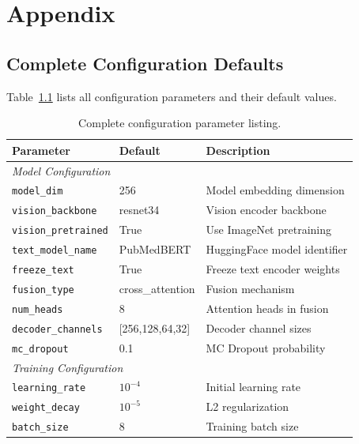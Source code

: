 
\appendix

\chapter{Appendix}
\label{ch:Appendix}

\section{Complete Configuration Defaults}
\label{sec:app:config}

Table~\ref{tab:full_config} lists all configuration parameters and their default values.

\begin{table}[htbp]
	\caption{Complete configuration parameter listing.}
	\label{tab:full_config}
	\centering
	\small
	\begin{tabular}{llp{6cm}}
		\toprule
		\textbf{Parameter} & \textbf{Default} & \textbf{Description} \\
		\midrule
		\multicolumn{3}{l}{\textit{Model Configuration}} \\
		\texttt{model\_dim}         & 256    & Model embedding dimension \\
		\texttt{vision\_backbone}   & resnet34 & Vision encoder backbone \\
		\texttt{vision\_pretrained} & True   & Use ImageNet pretraining \\
		\texttt{text\_model\_name}  & PubMedBERT & HuggingFace model identifier \\
		\texttt{freeze\_text}       & True   & Freeze text encoder weights \\
		\texttt{fusion\_type}       & cross\_attention & Fusion mechanism \\
		\texttt{num\_heads}         & 8      & Attention heads in fusion \\
		\texttt{decoder\_channels}  & [256,128,64,32] & Decoder channel sizes \\
		\texttt{mc\_dropout}        & 0.1    & MC Dropout probability \\
		\midrule
		\multicolumn{3}{l}{\textit{Training Configuration}} \\
		\texttt{learning\_rate}     & $10^{-4}$ & Initial learning rate \\
		\texttt{weight\_decay}      & $10^{-5}$ & L2 regularization \\
		\texttt{batch\_size}        & 8      & Training batch size \\

\end{tabular}
\end{table}
